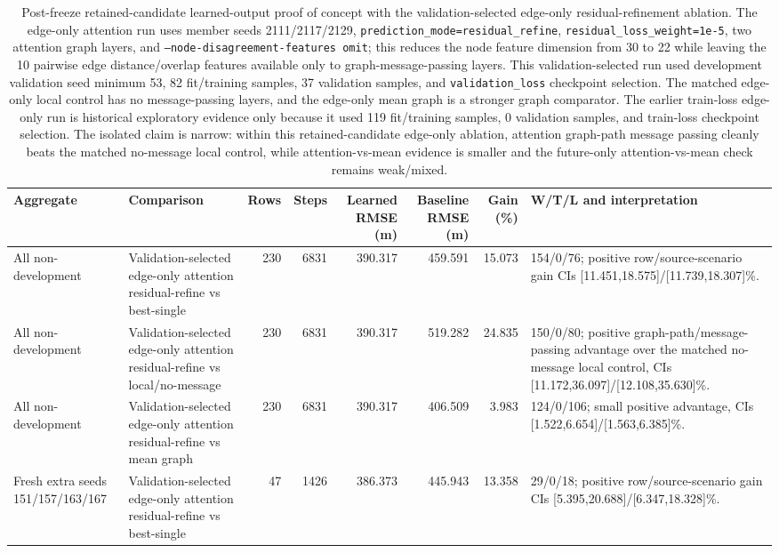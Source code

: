 \begin{table}[t]
\centering
\caption{Post-freeze retained-candidate learned-output proof of concept with the validation-selected edge-only residual-refinement ablation. The edge-only attention run uses member seeds 2111/2117/2129, \texttt{prediction\_mode=residual\_refine}, \texttt{residual\_loss\_weight=1e-5}, two attention graph layers, and \texttt{--node-disagreement-features omit}; this reduces the node feature dimension from 30 to 22 while leaving the 10 pairwise edge distance/overlap features available only to graph-message-passing layers. This validation-selected run used development validation seed minimum 53, 82 fit/training samples, 37 validation samples, and \texttt{validation\_loss} checkpoint selection. The matched edge-only local control has no message-passing layers, and the edge-only mean graph is a stronger graph comparator. The earlier train-loss edge-only run is historical exploratory evidence only because it used 119 fit/training samples, 0 validation samples, and train-loss checkpoint selection. The isolated claim is narrow: within this retained-candidate edge-only ablation, attention graph-path message passing cleanly beats the matched no-message local control, while attention-vs-mean evidence is smaller and the future-only attention-vs-mean check remains weak/mixed.}
\label{tab:main_trajectory_graph_selector_ensemble_poc}
\scriptsize
\setlength{\tabcolsep}{2.4pt}
\begin{tabular}{llrrrrrl}
\toprule
Aggregate & Comparison & Rows & Steps & Learned RMSE (m) & Baseline RMSE (m) & Gain (\%) & W/T/L and interpretation \\
\midrule
All non-development & Validation-selected edge-only attention residual-refine vs best-single & 230 & 6831 & 390.317 & 459.591 & 15.073 & 154/0/76; positive row/source-scenario gain CIs [11.451,18.575]/[11.739,18.307]\%. \\
All non-development & Validation-selected edge-only attention residual-refine vs local/no-message & 230 & 6831 & 390.317 & 519.282 & 24.835 & 150/0/80; positive graph-path/message-passing advantage over the matched no-message local control, CIs [11.172,36.097]/[12.108,35.630]\%. \\
All non-development & Validation-selected edge-only attention residual-refine vs mean graph & 230 & 6831 & 390.317 & 406.509 & 3.983 & 124/0/106; small positive advantage, CIs [1.522,6.654]/[1.563,6.385]\%. \\
Fresh extra seeds 151/157/163/167 & Validation-selected edge-only attention residual-refine vs best-single & 47 & 1426 & 386.373 & 445.943 & 13.358 & 29/0/18; positive row/source-scenario gain CIs [5.395,20.688]/[6.347,18.328]\%. \\

\end{tabular}
\end{table}
